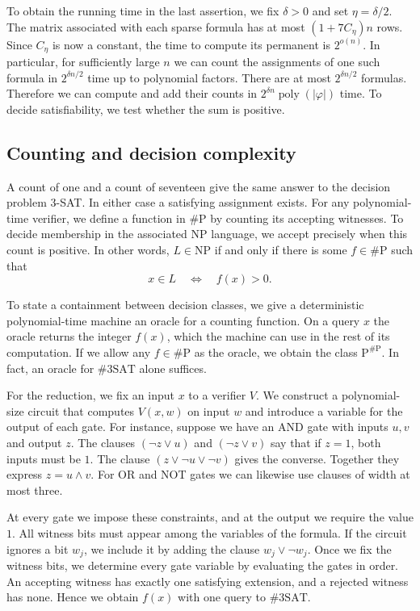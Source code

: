 \documentclass{article}
\theoremstyle{definition}
\begin{document}
To obtain the running time in the last assertion, we fix \(\delta>0\)
and set \(\eta=\delta/2\). The matrix associated with each sparse
formula has at most \((1+7C_\eta)n\) rows. Since \(C_\eta\) is now a
constant, the time to compute its permanent is \(2^{o(n)}\). In
particular, for sufficiently large \(n\) we can count the assignments
of one such formula in \(2^{\delta n/2}\) time up to polynomial factors.
There are at most \(2^{\delta n/2}\) formulas. Therefore we can compute
and add their counts in \(2^{\delta n}\operatorname{poly}(|\varphi|)\)
time. To decide satisfiability, we test whether the sum is positive.

\subsection*{Counting and decision complexity}\label{sec:counting-classes}

A count of one and a count of seventeen give the same answer to the
decision problem \(3\)-SAT. In either case a satisfying assignment
exists. For any polynomial-time verifier, we define a function in
\(\#\mathrm P\) by counting its accepting witnesses. To decide
membership in the associated \(\mathrm{NP}\) language, we accept
precisely when this count is positive. In other words, \(L\in\mathrm{NP}\)
if and only if there is some \(f\in\#\mathrm P\) such that
\[
    x\in L \quad\Longleftrightarrow\quad f(x)>0.
\]

To state a containment between decision classes, we give a deterministic
polynomial-time machine an oracle for a counting function. On a query
\(x\) the oracle returns the integer \(f(x)\), which the machine can use
in the rest of its computation. If we allow any \(f\in\#\mathrm P\) as
the oracle, we obtain the class \(\mathrm P^{\#\mathrm P}\). In fact, an oracle for
\(\#\mathrm{3SAT}\) alone suffices.

For the reduction, we fix an input \(x\) to a verifier \(V\). We construct
a polynomial-size circuit that computes \(V(x,w)\) on input \(w\)
and introduce a variable for the output of each gate. For instance,
suppose we have an AND gate with inputs \(u,v\) and output \(z\). The clauses
\((\neg z\vee u)\) and \((\neg z\vee v)\) say that if \(z=1\), both
inputs must be \(1\). The clause \((z\vee\neg u\vee\neg v)\) gives the
converse. Together they express \(z=u\wedge v\). For OR and NOT
gates we can likewise use clauses of width at most three.

At every gate we impose these constraints, and at the output we
require the value \(1\). All witness bits must appear among the
variables of the formula. If the circuit ignores a bit \(w_j\), we
include it by adding the clause \(w_j\vee\neg w_j\). Once we fix
the witness bits, we determine every gate variable by evaluating the
gates in order. An accepting witness has exactly one satisfying
extension, and a rejected witness has none. Hence we obtain \(f(x)\)
with one query to \(\#\mathrm{3SAT}\).
\end{document}
